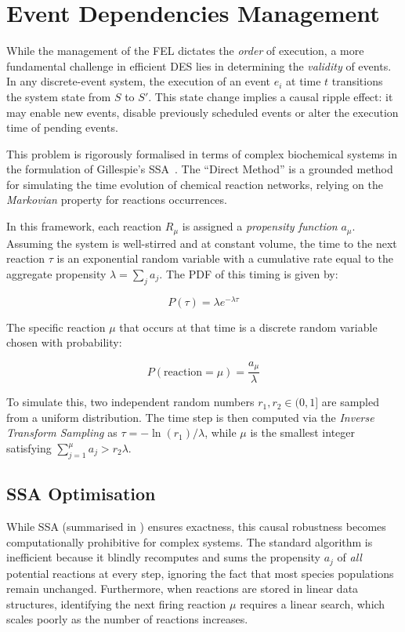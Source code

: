 \section{Event Dependencies Management}
\label{sec:dependency_management}

While the management of the \ac{FEL} dictates the \emph{order} of execution,
a more fundamental challenge in efficient \ac{DES} lies in determining the
\emph{validity} of events. In any discrete-event system, the execution of an
event $e_i$ at time $t$ transitions the system state from $S$ to $S'$. This
state change implies a causal ripple effect: it may enable new events, disable
previously scheduled events or alter the execution time of pending events.

This problem is rigorously formalised in terms of complex biochemical systems
in the formulation of Gillespie's \ac{SSA}~\cite{GillespieESSCCR:1977}. The
``Direct Method'' is a grounded method for simulating the time evolution of
chemical reaction networks, relying on the \emph{Markovian} property for
reactions occurrences.

In this framework, each reaction $R_\mu$ is assigned a \emph{propensity function}
$a_\mu$. Assuming the system is well-stirred and at constant volume, the
time to the next reaction $\tau$ is an exponential random variable with
a cumulative rate equal to the aggregate propensity $\lambda = \sum_j a_j$.
The \ac{PDF} of this timing is given by:

\begin{equation}\label{eq:nextreactiontime}
	P(\tau) = \lambda e^{-\lambda \tau}
\end{equation}

The specific reaction $\mu$ that occurs at that time is a discrete random
variable chosen with probability:

\begin{equation}\label{eq:nextreactionprobability}
	P(\text{reaction} = \mu) = \frac{a_{\mu}}{\lambda}
\end{equation}

To simulate this, two independent random numbers $r_1, r_2 \in (0, 1]$ are
sampled from a uniform distribution. The time step is then computed via the
\emph{Inverse Transform Sampling} as $\tau = -\ln(r_1)/\lambda$, while $\mu$ is
the smallest integer satisfying $\sum_{j=1}^{\mu} a_j > r_2 \lambda$.

\subsection{\ac{SSA} Optimisation}\label{ssec:ssa_optimisation}
While \ac{SSA} (summarised in ) ensures exactness, this
causal robustness becomes computationally prohibitive for complex systems.
The standard algorithm is inefficient because it blindly recomputes and sums the
propensity $a_j$ of \emph{all} potential reactions at every step, ignoring the
fact that most species populations remain unchanged. Furthermore, when reactions are
stored in linear data structures, identifying the next firing reaction $\mu$ requires
a linear search, which scales poorly as the number of reactions increases.

